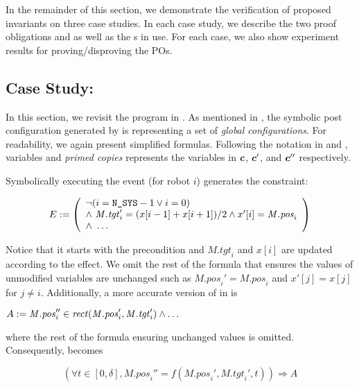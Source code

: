 In the remainder of this section,
we demonstrate the verification of proposed invariants on three case studies.
In each case study, we describe the two proof obligations  and 
as well as the \portasum{}s in use.
For each case, we also show experiment results for proving/disproving the POs.


\subsection{Case Study: \LineForm}

\newcommand{\Mposi}{\mathit{M.pos}_i}
\newcommand{\Mtgti}{\mathit{M.tgt}_i}

In this section, we revisit the \LineForm program in .
As mentioned in , the symbolic post configuration generated by \K is representing a set of \emph{global configurations}.
For readability, we again present simplified formulas.
Following the notation in  and ,
variables and \emph{primed copies} represents the variables in $\mathit{\boldsymbol{c}}$, $\mathit{\boldsymbol{c}}'$, and $\mathit{\boldsymbol{c}}''$ respectively.

Symbolically executing the event  (for robot $i$) generates the constraint:
\begin{small}
\[
E :=
\left(
\begin{array}{l}
    \neg (i = \NMAX - 1 \lor i = 0) \\
    \land\ \Mtgti' = (x[i-1] + x[i+1])/2 \land x'[i] = \Mposi \\
    \land\ \dots
\end{array}
\right)
\]
\end{small}
Notice that it starts with the precondition and $\Mtgti$ and $x[i]$ are updated according to the effect.
We omit the rest of the formula that ensures the values of unmodified variables are unchanged
such as $\Mposi'=\Mposi$ and $x'[j]=x[j]$ for $j\neq i$.
Additionally, a more accurate version of  in  is
\begin{assumption}
\(
    A := \Mposi'' \in \rect(\Mposi', \Mtgti') \land \dots
\)
\end{assumption}
\noindent where the rest of the formula ensuring unchanged values is omitted.
Consequently,  becomes
\begin{proofob}
\[
(\forall t \in [0,\delta], \Mposi'' = f(\Mposi', \Mtgti', t)) \Rightarrow A
\]
\end{proofob}

